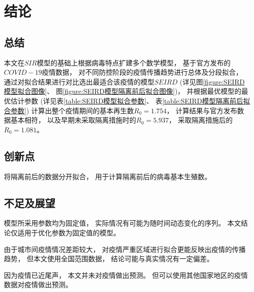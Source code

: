 \section{结论}
\subsection{总结}
\par 本文在$SIR$模型的基础上根据病毒特点扩建多个数学模型，
基于官方发布的$COVID-19$疫情数据，
对不同防控阶段的疫情传播趋势进行总体及分段拟合，
通过对拟合结果进行对比选出最适合该疫情的模型$SEIRD$
(详见图\ref{figure:SEIRD模型拟合图像}、
图\ref{figure:SEIRD模型隔离前后拟合图像})，
并根据最优模型的最优估计参数
(详见表\ref{table:SEIRD模型拟合参数}、
表\ref{table:SEIRD模型隔离前后拟合参数})
计算出整个疫情期间的基本再生数$R_0=1.754$，
计算结果与官方发布数据基本相符，
以及早期未采取隔离措施时的$R_0=5.937$，
采取隔离措施后的$R_0=1.081$。
\subsection{创新点}
\par 将隔离前后的数据分开拟合，
用于计算隔离前后的病毒基本生殖数。
\subsection{不足及展望}
\par 模型所采用参数均为固定值，
实际情况有可能为随时间动态变化的序列。
本文结论仅适用于优化参数为固定值的模型。
\par 由于城市间疫情情况差距较大，
对疫情严重区域进行拟合更能反映出疫情的传播趋势，
但本文使用全国范围数据，
结论可能与真实情况有一定偏差。
\par 因为疫情已近尾声，
本文并未对疫情做出预测。
但可以使用其他国家地区的疫情数据对疫情做出预测。
